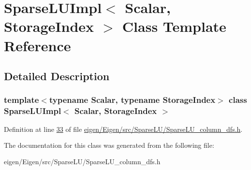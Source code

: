 \hypertarget{class_sparse_l_u_impl}{}\section{Sparse\+L\+U\+Impl$<$ Scalar, Storage\+Index $>$ Class Template Reference}
\label{class_sparse_l_u_impl}


\subsection{Detailed Description}
\subsubsection*{template$<$typename Scalar, typename Storage\+Index$>$\newline
class Sparse\+L\+U\+Impl$<$ Scalar, Storage\+Index $>$}



Definition at line \hyperlink{eigen_2_eigen_2src_2_sparse_l_u_2_sparse_l_u__column__dfs_8h_source_l00033}{33} of file \hyperlink{eigen_2_eigen_2src_2_sparse_l_u_2_sparse_l_u__column__dfs_8h_source}{eigen/\+Eigen/src/\+Sparse\+L\+U/\+Sparse\+L\+U\+\_\+column\+\_\+dfs.\+h}.



The documentation for this class was generated from the following file\+:\begin{DoxyCompactItemize}
\item 
eigen/\+Eigen/src/\+Sparse\+L\+U/\+Sparse\+L\+U\+\_\+column\+\_\+dfs.\+h\end{DoxyCompactItemize}
